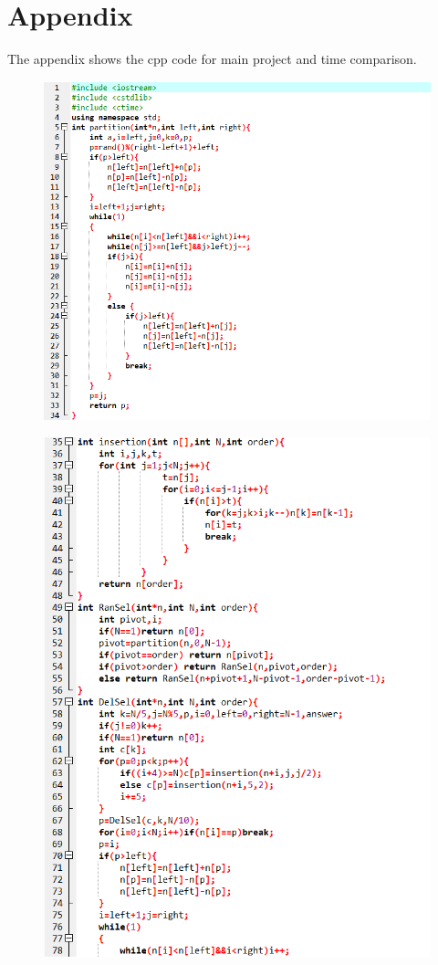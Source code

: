 \documentclass[12pt]{article}
\begin{document}
\section{Appendix}
The appendix shows the cpp code for main project and time comparison.
\begin{figure}[H]
\centering
\includegraphics[scale=0.6]{P4.png}
\end{figure}
\begin{figure}[H]
\centering
\includegraphics[scale=0.6]{P5.png}
\end{figure}
\end{document}
